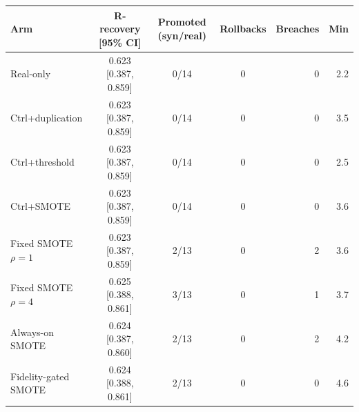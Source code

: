 \begin{tabular}{lcccrr}
\toprule
Arm & R-recovery [95\% CI] & Promoted (syn/real) & Rollbacks & Breaches & Min \\
\midrule
Real-only & 0.623 [0.387, 0.859] & 0/14 & 0 & 0 & 2.2 \\
Ctrl+duplication & 0.623 [0.387, 0.859] & 0/14 & 0 & 0 & 3.5 \\
Ctrl+threshold & 0.623 [0.387, 0.859] & 0/14 & 0 & 0 & 2.5 \\
Ctrl+SMOTE & 0.623 [0.387, 0.859] & 0/14 & 0 & 0 & 3.6 \\
Fixed SMOTE $\rho{=}1$ & 0.623 [0.387, 0.859] & 2/13 & 0 & 2 & 3.6 \\
Fixed SMOTE $\rho{=}4$ & 0.625 [0.388, 0.861] & 3/13 & 0 & 1 & 3.7 \\
Always-on SMOTE & 0.624 [0.387, 0.860] & 2/13 & 0 & 2 & 4.2 \\
Fidelity-gated SMOTE & 0.624 [0.388, 0.861] & 2/13 & 0 & 0 & 4.6 \\
\bottomrule
\end{tabular}
